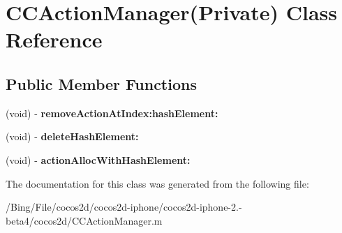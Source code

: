 \hypertarget{interface_c_c_action_manager_07_private_08}{\section{C\-C\-Action\-Manager(Private) Class Reference}
\label{interface_c_c_action_manager_07_private_08}
}
\subsection*{Public Member Functions}
\begin{DoxyCompactItemize}
\item 
\hypertarget{interface_c_c_action_manager_07_private_08_a9c7766face6fa119b99532a975f3eec1}{(void) -\/ {\bfseries remove\-Action\-At\-Index\-:hash\-Element\-:}}\label{interface_c_c_action_manager_07_private_08_a9c7766face6fa119b99532a975f3eec1}

\item 
\hypertarget{interface_c_c_action_manager_07_private_08_acf52adb3447e967b37b5758f7f5878f7}{(void) -\/ {\bfseries delete\-Hash\-Element\-:}}\label{interface_c_c_action_manager_07_private_08_acf52adb3447e967b37b5758f7f5878f7}

\item 
\hypertarget{interface_c_c_action_manager_07_private_08_ad9509a7673234624edaa984ae83e0c32}{(void) -\/ {\bfseries action\-Alloc\-With\-Hash\-Element\-:}}\label{interface_c_c_action_manager_07_private_08_ad9509a7673234624edaa984ae83e0c32}

\end{DoxyCompactItemize}


The documentation for this class was generated from the following file\-:\begin{DoxyCompactItemize}
\item 
/\-Bing/\-File/cocos2d/cocos2d-\/iphone/cocos2d-\/iphone-\/2.-\/beta4/cocos2d/C\-C\-Action\-Manager.\-m\end{DoxyCompactItemize}
